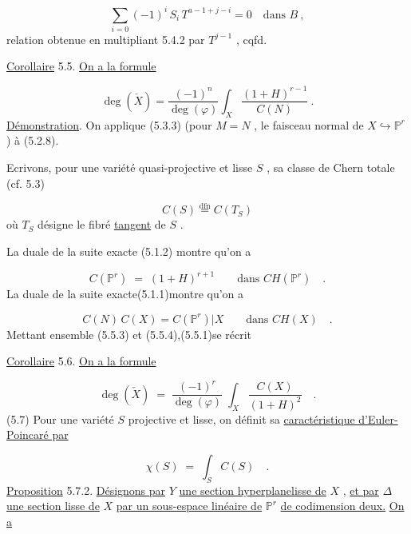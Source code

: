 \begin{equation}\tag{5.4.7}
\sum_{i=0} (-1)^i \, S_i \, T^{a-1+j-i} = 0 \quad \mbox{dans } B \ ,
\end{equation}
relation obtenue en multipliant 5.4.2 par $T^{j-1}$ , cqfd.

\underline{Corollaire} 5.5. \underline{On a la formule}

\begin{equation}\tag{5.5.1}
\deg(\check{X}) = \frac{(-1)^n}{\deg(\varphi)} \int_X \frac{(1+H)^{r-1}}{C(N)} \ .
\end{equation}
\underline{Démonstration}. On applique (5.3.3) (pour $M = N$ , le faisceau normal de $X \hookrightarrow \mathbb{P}^r$) à (5.2.8).

Ecrivons, pour une variété quasi-projective et lisse $S$ , sa classe de Chern totale (cf. 5.3)

\begin{equation}\tag{5.5.2}
C(S) \stackrel{\mathrm{dfn}}{=} C(T_S)
\end{equation}
où $T_S$ désigne le fibré \underline{tangent} de $S$ .



La duale de la suite exacte (5.1.2) montre qu'on a

\begin{equation}\tag{5.5.3}
C(\mathbb{P}^r) \;=\; (1 + H)^{r+1} \qquad \text{dans } CH(\mathbb{P}^r) \quad .
\end{equation}
La duale de la suite exacte(5.1.1)montre qu'on a

\begin{equation}\tag{5.5.4}
C(N)\, C(X) = C(\mathbb{P}^r)|X \qquad \text{dans } CH(X) \quad .
\end{equation}
Mettant ensemble (5.5.3) et (5.5.4),(5.5.1)se récrit

\underline{Corollaire} 5.6. \qquad \underline{On a la formule}

\begin{equation}\tag{5.6.1}
\deg(\check{X}) \;=\; \frac{(-1)^r}{\deg(\varphi)} \; \int_X \frac{C(X)}{(1+H)^2} \quad .
\end{equation}
(5.7) Pour une variété $S$ projective et lisse, on définit sa \underline{caractéristique d'Euler-Poincaré par}

\begin{equation}\tag{5.7.1}
\chi(S) \;=\; \int_S C(S) \quad .
\end{equation}
\underline{Proposition} 5.7.2. \qquad \underline{Désignons par} $Y$ \underline{une section hyperplanelisse de} $X$ , \underline{et par} $\Delta$ \underline{une section lisse de} $X$ \underline{par un sous-espace linéaire de} $\mathbb{P}^r$ \underline{de codimension deux.} \underline{On a}

